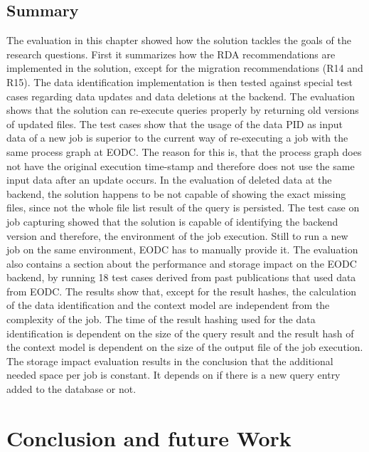\documentclass[draft,final]{vutinfth} %
\begin{document}
\section{Summary}
The evaluation in this chapter showed how the solution tackles the goals of the research questions. First it summarizes how the RDA recommendations are implemented in the solution, except for the migration recommendations (R14 and R15). The data identification implementation is then tested against special test cases regarding data updates and data deletions at the backend. The evaluation shows that the solution can re-execute queries properly by returning old versions of updated files. The test cases show that the usage of the data PID as input data of a new job is superior to the current way of re-executing a job with the same process graph at EODC. The reason for this is, that the process graph does not have the original execution time-stamp and therefore does not use the same input data after an update occurs. In the evaluation of deleted data at the backend, the solution happens to be not capable of showing the exact missing files, since not the whole file list result of the query is persisted. The test case on job capturing showed that the solution is capable of identifying the backend version and therefore, the environment of the job execution. Still to run a new job on the same environment, EODC has to manually provide it. The evaluation also contains a section about the performance and storage impact on the EODC backend, by running 18 test cases derived from past publications that used data from EODC. The results show that, except for the result hashes, the calculation of the data identification and the context model are independent from the complexity of the job. The time of the result hashing used for the data identification is dependent on the size of the query result and the result hash of the context model is dependent on the size of the output file of the job execution. The storage impact evaluation results in the conclusion that the additional needed space per job is constant. It depends on if there is a new query entry added to the database or not.
   
\chapter{Conclusion and future Work}\label{Conclusion}
\end{document}
